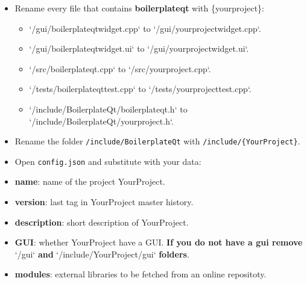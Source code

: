 \begin{itemize}
      \item
            Rename every file that contains \textbf{boilerplateqt} with
            \{yourproject\}:
            \begin{itemize}
                  \item
                        `/gui/boilerplateqtwidget.cpp` to `/gui/{yourproject}widget.cpp`.

                  \item
                        `/gui/boilerplateqtwidget.ui` to `/gui/{yourproject}widget.ui`.

                  \item
                        `/src/boilerplateqt.cpp` to `/src/{yourproject}.cpp`.

                  \item
                        `/tests/boilerplateqttest.cpp` to `/tests/{yourproject}test.cpp`.

                  \item
                        `/include/BoilerplateQt/boilerplateqt.h` to `/include/BoilerplateQt/{yourproject}.h`.
            \end{itemize}
\end{itemize}


\begin{itemize}
      \item
            Rename the folder \texttt{/include/BoilerplateQt} with
            \texttt{/include/\{YourProject\}}.
\end{itemize}

\begin{itemize}
      \item
            Open \texttt{config.json} and substitute with your data:
\end{itemize}

\begin{itemize}
      \item \textbf{name}: name of the project {YourProject}.

      \item \textbf{version}: last tag in {YourProject} master history.

      \item \textbf{description}: short description of {YourProject}.

      \item \textbf{GUI}: whether {YourProject} have a GUI. \textbf{If you do not have a gui remove} `/gui` \textbf{and} `/include/{YourProject}/gui` \textbf{folders}.

      \item \textbf{modules}: external libraries to be fetched from an online repositoty.
\end{itemize}

